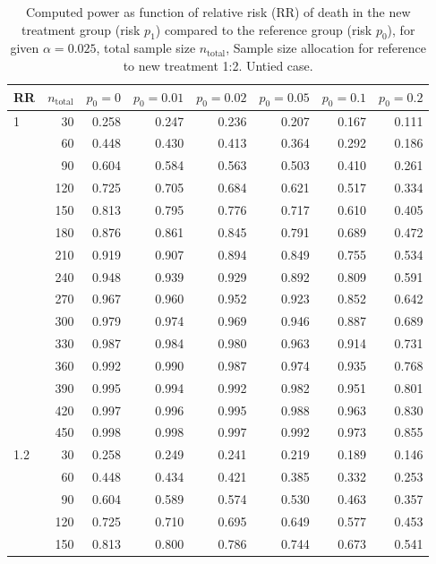 \documentclass[bimj,fleqn]{w-art}\usepackage[]{graphicx}\usepackage[]{color}
\theoremstyle{plain}
\theoremstyle{definition}
\begin{document}
\begin{table}[ht]
\centering
\caption{Computed power as function of relative risk
             (RR) of death in the new treatment group (risk $p_1$) compared to
             the reference group (risk $p_0$), for given $\alpha =0.025$,
             total sample size $n_{\text{total}}$, Sample size allocation for
             reference to new treatment 1:2. Untied case.} 
\label{tab:AppendixUntied}
\begin{tabular}{lrrrrrrr}
  \hline
RR & $n_{\text{total}}$ & $p_0 = 0$ & $p_0 = 0.01$ & $p_0 = 0.02$ & $p_0 = 0.05$ & $p_0 = 0.1$ & $p_0 = 0.2$ \\ 
  \hline
1 & 30 & 0.258 & 0.247 & 0.236 & 0.207 & 0.167 & 0.111 \\ 
   & 60 & 0.448 & 0.430 & 0.413 & 0.364 & 0.292 & 0.186 \\ 
   & 90 & 0.604 & 0.584 & 0.563 & 0.503 & 0.410 & 0.261 \\ 
   & 120 & 0.725 & 0.705 & 0.684 & 0.621 & 0.517 & 0.334 \\ 
   & 150 & 0.813 & 0.795 & 0.776 & 0.717 & 0.610 & 0.405 \\ 
   & 180 & 0.876 & 0.861 & 0.845 & 0.791 & 0.689 & 0.472 \\ 
   & 210 & 0.919 & 0.907 & 0.894 & 0.849 & 0.755 & 0.534 \\ 
   & 240 & 0.948 & 0.939 & 0.929 & 0.892 & 0.809 & 0.591 \\ 
   & 270 & 0.967 & 0.960 & 0.952 & 0.923 & 0.852 & 0.642 \\ 
   & 300 & 0.979 & 0.974 & 0.969 & 0.946 & 0.887 & 0.689 \\ 
   & 330 & 0.987 & 0.984 & 0.980 & 0.963 & 0.914 & 0.731 \\ 
   & 360 & 0.992 & 0.990 & 0.987 & 0.974 & 0.935 & 0.768 \\ 
   & 390 & 0.995 & 0.994 & 0.992 & 0.982 & 0.951 & 0.801 \\ 
   & 420 & 0.997 & 0.996 & 0.995 & 0.988 & 0.963 & 0.830 \\ 
   & 450 & 0.998 & 0.998 & 0.997 & 0.992 & 0.973 & 0.855 \\ 
  1.2 & 30 & 0.258 & 0.249 & 0.241 & 0.219 & 0.189 & 0.146 \\ 
   & 60 & 0.448 & 0.434 & 0.421 & 0.385 & 0.332 & 0.253 \\ 
   & 90 & 0.604 & 0.589 & 0.574 & 0.530 & 0.463 & 0.357 \\ 
   & 120 & 0.725 & 0.710 & 0.695 & 0.649 & 0.577 & 0.453 \\ 
   & 150 & 0.813 & 0.800 & 0.786 & 0.744 & 0.673 & 0.541 \\ 

\end{tabular}
\end{table}
\end{document}
